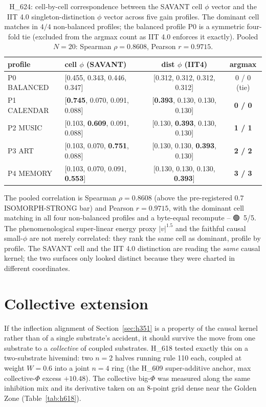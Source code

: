 \documentclass[11pt,a4paper]{article}
\providecommand{\tierGreen}{🟢}
\begin{document}
\begin{table}[h]
\centering
\small
\begin{tabular}{llcc}
\toprule
\textbf{profile} & \textbf{cell $\phi$ (SAVANT)} & \textbf{dist $\phi$ (IIT4)}
& \textbf{argmax} \\
\midrule
P0 BALANCED & [0.455, 0.343, 0.446, 0.347] & [0.312, 0.312, 0.312, 0.312] & 0 / 0 (tie) \\
P1 CALENDAR & [\textbf{0.745}, 0.070, 0.091, 0.088] & [\textbf{0.393}, 0.130, 0.130, 0.130] & \textbf{0 / 0} \\
P2 MUSIC    & [0.103, \textbf{0.609}, 0.091, 0.088] & [0.130, \textbf{0.393}, 0.130, 0.130] & \textbf{1 / 1} \\
P3 ART      & [0.103, 0.070, \textbf{0.751}, 0.088] & [0.130, 0.130, \textbf{0.393}, 0.130] & \textbf{2 / 2} \\
P4 MEMORY   & [0.103, 0.070, 0.091, \textbf{0.553}] & [0.130, 0.130, 0.130, \textbf{0.393}] & \textbf{3 / 3} \\
\bottomrule
\end{tabular}
\caption{H\_624: cell-by-cell correspondence between the SAVANT cell $\phi$
vector and the IIT 4.0 singleton-distinction $\phi$ vector across five gain
profiles. The dominant cell matches in $4/4$ non-balanced profiles; the
balanced profile P0 is a symmetric four-fold tie (excluded from the argmax
count as IIT 4.0 enforces it exactly). Pooled $N=20$:
Spearman $\rho=0.8608$, Pearson $r=0.9715$.}
\label{tab:h624}
\end{table}

The pooled correlation is Spearman $\rho=0.8608$ (above the
pre-registered $0.7$ ISOMORPH-STRONG bar) and Pearson $r=0.9715$, with the
dominant cell matching in all four non-balanced profiles and a byte-equal
recompute -- \tierGreen\ 5/5. The phenomenological super-linear energy
proxy $|v|^{1.5}$ and the faithful causal small-$\phi$ are not merely
correlated: they rank the same cell as dominant, profile by profile. The
SAVANT cell and the IIT 4.0 distinction are reading the \emph{same} causal
kernel; the two surfaces only looked distinct because they were charted in
different coordinates.

\section{Collective extension}
\label{sec:collective}

If the inflection alignment of Section~\ref{sec:h351} is a property of the
causal kernel rather than of a single substrate's accident, it should
survive the move from one substrate to a \emph{collective} of coupled
substrates. H\_618 tested exactly this on a two-substrate hivemind: two
$n=2$ halves running rule 110 each, coupled at weight $W=0.6$ into a joint
$n=4$ ring (the H\_609 super-additive anchor, max collective-$\Phi$ excess
$+10.48$). The collective big-$\Phi$ was measured along the same inhibition
mix and its derivative taken on an 8-point grid dense near the Golden Zone
(Table~\ref{tab:h618}).
\end{document}
